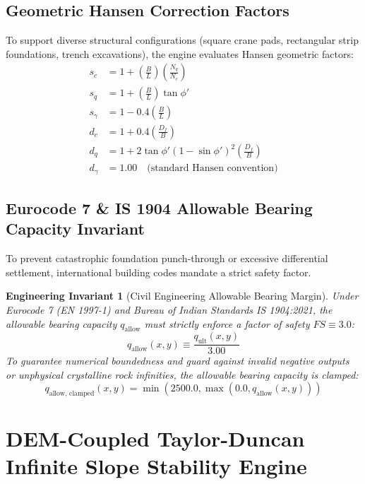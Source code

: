 \documentclass[11pt,a4paper]{article}
\newtheorem{invariant}{Engineering Invariant}[section]
\theoremstyle{definition}
\theoremstyle{remark}
\begin{document}
\subsection{Geometric Hansen Correction Factors}
To support diverse structural configurations (square crane pads, rectangular strip foundations, trench excavations), the engine evaluates Hansen geometric factors:
\begin{align}
    s_c &= 1 + \left( \frac{B}{L} \right) \left( \frac{N_q}{N_c} \right) \\
    s_q &= 1 + \left( \frac{B}{L} \right) \tan \phi' \\
    s_\gamma &= 1 - 0.4 \left( \frac{B}{L} \right) \\
    d_c &= 1 + 0.4 \left( \frac{D_f}{B} \right) \\
    d_q &= 1 + 2 \tan \phi' (1 - \sin \phi')^2 \left( \frac{D_f}{B} \right) \\
    d_\gamma &= 1.00 \quad \text{(standard Hansen convention)}
\end{align}

\subsection{Eurocode 7 \& IS 1904 Allowable Bearing Capacity Invariant}
To prevent catastrophic foundation punch-through or excessive differential settlement, international building codes mandate a strict safety factor.
\begin{invariant}[Civil Engineering Allowable Bearing Margin]
    Under Eurocode 7 (EN 1997-1) and Bureau of Indian Standards IS 1904:2021, the allowable bearing capacity $q_{\text{allow}}$ must strictly enforce a factor of safety $FS \equiv 3.0$:
    \begin{equation}
        q_{\text{allow}}(x, y) \equiv \frac{q_{\text{ult}}(x, y)}{3.00}
    \end{equation}
    To guarantee numerical boundedness and guard against invalid negative outputs or unphysical crystalline rock infinities, the allowable bearing capacity is clamped:
    \begin{equation}
        q_{\text{allow, clamped}}(x, y) = \min\left( 2500.0, \max\left( 0.0, q_{\text{allow}}(x, y) \right) \right)
    \end{equation}
\end{invariant}


\section{DEM-Coupled Taylor-Duncan Infinite Slope Stability Engine}
\end{document}
